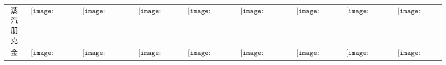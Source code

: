 \begin{longtable}{|c|cccccccc|}
蒸汽朋克&$\begin{array}{c}\texttt{[image: figures/Steampunk\_Candle.png]}\end{array}$&$\begin{array}{c}\texttt{[image: figures/Steampunk\_Candelabra.png]}\end{array}$&$\begin{array}{c}\texttt{[image: figures/Steampunk\_Lamp.png]}\end{array}$&$\begin{array}{c}\texttt{[image: figures/Steampunk\_Lantern.png]}\end{array}$&$\begin{array}{c}\texttt{[image: figures/Steampunk\_Chandelier.png]}\end{array}$&$\begin{array}{c}\texttt{[image: figures/Steampunk\_Door.png]}\end{array}$&$\begin{array}{c}\texttt{[image: figures/Steampunk\_Toilet.png]}\end{array}$&$\begin{array}{c}\texttt{[image: figures/Steampunk\_Chest.png]}\end{array}$\\
金&$\begin{array}{c}\texttt{[image: figures/Golden\_Candle.png]}\end{array}$&$\begin{array}{c}\texttt{[image: figures/Golden\_Candelabra.png]}\end{array}$&$\begin{array}{c}\texttt{[image: figures/Golden\_Lamp.png]}\end{array}$&$\begin{array}{c}\texttt{[image: figures/Golden\_Lantern.png]}\end{array}$&$\begin{array}{c}\texttt{[image: figures/Golden\_Chandelier.png]}\end{array}$&$\begin{array}{c}\texttt{[image: figures/Golden\_Door.png]}\end{array}$&$\begin{array}{c}\texttt{[image: figures/Golden\_Toilet.png]}\end{array}$&$\begin{array}{c}\texttt{[image: figures/Golden\_Chest.png]}\end{array}$\\
\end{longtable}
